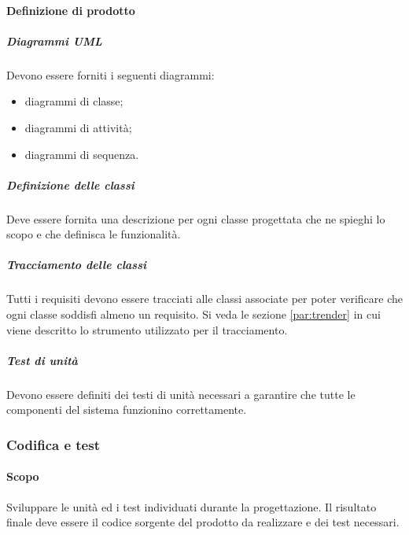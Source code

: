                 \paragraph{Definizione di prodotto}
                \subparagraph{Diagrammi UML}
                Devono essere forniti i seguenti diagrammi:
                \begin{itemize}
                    \item diagrammi di classe;
                    \item diagrammi di attività;
                    \item diagrammi di sequenza.
                \end{itemize}
                \subparagraph{Definizione delle classi}
                Deve essere fornita una descrizione per ogni classe progettata che ne spieghi lo scopo e che definisca le funzionalità.
                \subparagraph{Tracciamento delle classi}
                Tutti i requisiti devono essere tracciati alle classi associate per poter verificare che ogni classe soddisfi almeno un requisito. Si veda le sezione \ref{par:trender} in cui viene descritto lo strumento utilizzato per il tracciamento.
                \subparagraph{Test di unità}
                Devono essere definiti dei testi di unità necessari a garantire che tutte le componenti del sistema funzionino correttamente.
            \subsubsection{Codifica e test}
                \paragraph{Scopo}
                Sviluppare le unità ed i test individuati durante la progettazione. Il risultato finale deve essere il codice sorgente del prodotto da realizzare e dei test necessari.
